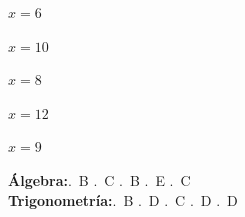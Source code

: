 \begin{multicols}{2}
\begin{alternativas}
  \item $x = 6$
  \item $x = 10$
  \item $x = 8$
  \item $x = 12$
  \item $x = 9$
\end{alternativas}

\end{multicols}

\vspace{0.5cm}

\begin{tcolorbox}[
  enhanced, colback=GrisClaro, colframe=GrisMedio,
  arc=2pt, boxrule=0.5pt,
  fonttitle=\sffamily\bfseries\small\color{GrisCarbón},
  title={Clave de Respuestas — Exámenes (Álgebra y Trigonometría)}
]
\small\sffamily
\begin{multicols}{2}
  \textbf{Álgebra:}.~B .~C .~B .~E .~C \\[4pt]
  \textbf{Trigonometría:}.~B .~D .~C .~D .~D
\end{multicols}
\end{tcolorbox}

